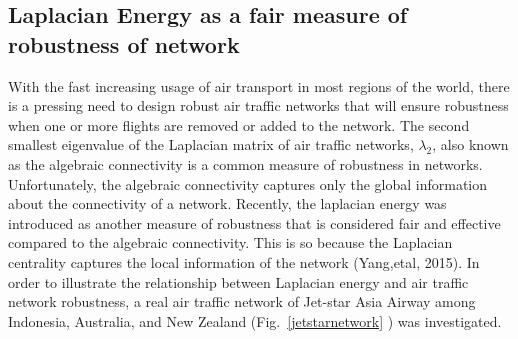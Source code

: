 \documentclass[10pt,a4paper]{article}
\begin{document}
\subsection{Laplacian Energy as a fair measure of robustness of network}
With the fast increasing usage of air transport in most regions of the world, there is a pressing need to design robust air traffic networks that will ensure robustness when one or more flights are removed or added to the network. The second smallest eigenvalue of the Laplacian matrix of air traffic networks, $\lambda_2$, also known as the algebraic connectivity is a common measure of robustness in networks. Unfortunately, the algebraic connectivity captures only the global information about the connectivity of a network.
Recently, the laplacian energy was introduced as another measure of robustness that is considered fair and effective compared to the algebraic connectivity. This is so because the Laplacian centrality captures the local information of the network (Yang,etal, 2015). 
In order to illustrate the relationship between Laplacian energy and air traffic network
robustness, a real air traffic network of Jet-star Asia Airway among Indonesia, Australia,
and New Zealand (Fig.~\ref{jetstarnetwork} ) was investigated.
\end{document}
